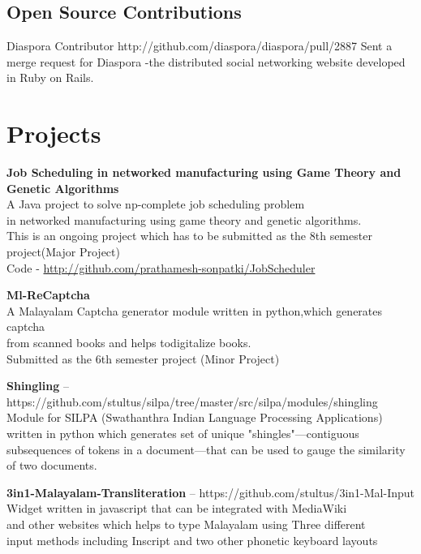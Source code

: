 \documentclass[11pt,a4paper]{moderncv}
\begin{document}
\subsection{Open Source Contributions}

\cventry
         {}
         {Diaspora}
         {Contributor}
         {}
         {http://github.com/diaspora/diaspora/pull/2887}
         {
          Sent a merge request for Diaspora -the distributed social
          networking website developed in Ruby on Rails. }



\section{Projects}

\cvlistitem
{\textbf{Job Scheduling in networked manufacturing using Game Theory
    and Genetic Algorithms}  
  \\A Java project to solve np-complete job scheduling problem \\
    in networked manufacturing using game theory and genetic algorithms.\\
    This is an ongoing project which has to be submitted as the 8th
    semester project(Major Project) \\
    Code - \url{http://github.com/prathamesh-sonpatki/JobScheduler}
}

\cvlistitem
{\textbf{Ml-ReCaptcha}  
  \\A Malayalam Captcha generator module written in python,which generates captcha\\
    from scanned books and helps todigitalize books.\\
    Submitted as the 6th semester project (Minor Project) \\
}

\cvlistitem
{\textbf{Shingling} -- {\small https://github.com/stultus/silpa/tree/master/src/silpa/modules/shingling}
  \\Module for SILPA (Swathanthra Indian Language Processing Applications)\\
    written in python which generates set of unique "shingles"—contiguous  \\
    subsequences of tokens in a document—that can be used to gauge the similarity of two documents.\\
}

\cvlistitem
{\textbf{3in1-Malayalam-Transliteration} -- {\small https://github.com/stultus/3in1-Mal-Input}
  \\Widget written in javascript that can be integrated with MediaWiki \\
    and other websites which helps to type Malayalam using Three different\\
    input methods including Inscript and two other phonetic keyboard layouts
}
\end{document}
